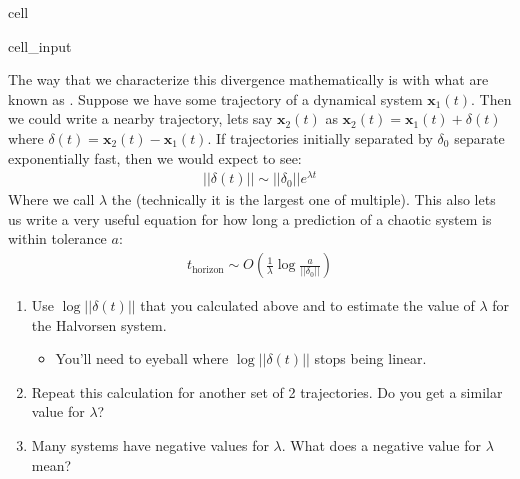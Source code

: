 \documentclass[letterpaper,10pt,english]{jupyterBook}
\begin{document}
\begin{sphinxuseclass}{cell}\begin{sphinxVerbatimInput}

\begin{sphinxuseclass}{cell_input}
\begin{sphinxVerbatim}[commandchars=\\\{\}]
\end{sphinxVerbatim}

\end{sphinxuseclass}\end{sphinxVerbatimInput}

\end{sphinxuseclass}
\sphinxAtStartPar
The way that we characterize this divergence mathematically is with what are known as . Suppose we have some trajectory of a dynamical system \(\mathbf{x}_1(t)\). Then we could write a nearby trajectory, lets say \(\mathbf{x}_2(t)\) as \(\mathbf{x}_2(t) = \mathbf{x}_1(t) + \delta(t)\) where \(\delta(t) = \mathbf{x}_2(t) - \mathbf{x}_1(t)\). If trajectories initially separated by \(\delta_0\) separate exponentially fast, then we would expect to see:
\begin{equation*}
\begin{split}
||\delta(t)|| \sim ||\delta_0||e^{\lambda t}
\end{split}
\end{equation*}
\sphinxAtStartPar
Where we call \(\lambda\) the  (technically it is the largest one of multiple). This also lets us write a very useful equation for how long a prediction of a chaotic system is within tolerance \(a\):
\begin{equation*}
\begin{split}
t_{\text{horizon}} \sim O\left(\frac{1}{\lambda}\log{\frac{a}{||\delta_0||}}\right)
\end{split}
\end{equation*}
\sphinxAtStartPar
{}
\begin{enumerate}
%
\item {} 
\sphinxAtStartPar
Use \(\log ||\delta(t)||\) that you calculated above and  to estimate the value of \(\lambda\) for the Halvorsen system.
\begin{itemize}
\item {} 
\sphinxAtStartPar
You’ll need to eyeball where \(\log ||\delta(t)||\) stops being linear.

\end{itemize}

\item {} 
\sphinxAtStartPar
Repeat this calculation for another set of 2 trajectories. Do you get a similar value for \(\lambda\)?

\item {} 
\sphinxAtStartPar
Many systems have negative values for \(\lambda\). What does a negative value for \(\lambda\) mean?

\end{enumerate}
\end{document}
